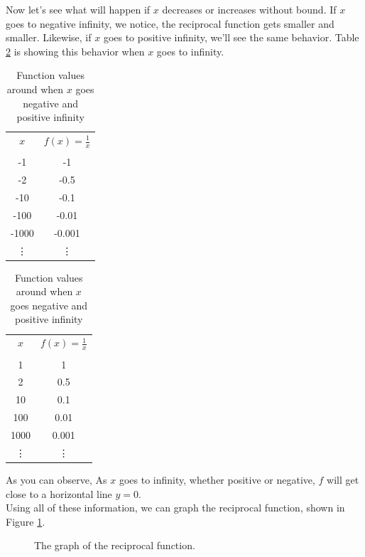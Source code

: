 Now let's see what will happen if $x$ decreases or increases without bound. If $x$ goes to negative infinity, we notice, the reciprocal function gets smaller and smaller. Likewise, if $x$ goes to positive infinity, we'll see the same behavior. Table \ref{tab:reciprocal_infinity} is showing this behavior when $x$ goes to infinity.
\begin{table}[ht]
\centering
\caption{Function values around when $x$ goes negative and positive infinity}

\begin{tabular}{c|c}
    $x$ & $f(x)=\frac{1}{x}$ \\
    \\[-1em]
    \hline
    -1     & -1 \\
    -2   & -0.5 \\
    -10   & -0.1 \\
    -100  & -0.01 \\
    -1000 & -0.001 \\
    \vdots & \vdots
\end{tabular}
\qquad
\begin{tabular}{c|c}
    $x$ & $f(x)=\frac{1}{x}$ \\
    \\[-1em]
    \hline
    1     & 1 \\
    2   & 0.5 \\
    10   & 0.1 \\
    100  & 0.01 \\
    1000 & 0.001 \\
    \vdots & \vdots
\end{tabular}
\label{tab:reciprocal_infinity}
\end{table}
As you can observe, As $x$ goes to infinity, whether positive or negative, $f$ will get close to a horizontal line $y=0$.\\
Using all of these information, we can graph the reciprocal function, shown in Figure \ref{fig:reciprocal}. 
\begin{figure}[ht]
\centering
 \caption{The graph of the reciprocal function.}
 \label{fig:reciprocal}
\end{figure}
